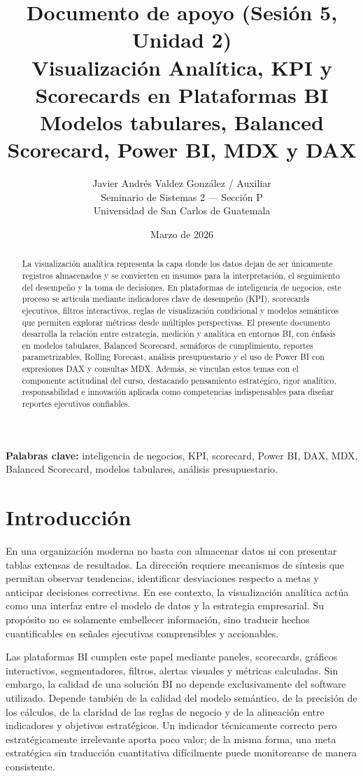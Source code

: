 \documentclass[12pt]{article}
\title{\textbf{Documento de apoyo (Sesión 5, Unidad 2)}\\
\large Visualización Analítica, KPI y Scorecards en Plataformas BI\\
\normalsize Modelos tabulares, Balanced Scorecard, Power BI, MDX y DAX}
\author{Javier Andrés Valdez González / Auxiliar \\
\small Seminario de Sistemas 2 --- Sección P \\
\small Universidad de San Carlos de Guatemala}
\date{Marzo de 2026}
\begin{document}
\maketitle

\begin{abstract}
La visualización analítica representa la capa donde los datos dejan de ser únicamente registros almacenados y se convierten en insumos para la interpretación, el seguimiento del desempeño y la toma de decisiones. En plataformas de inteligencia de negocios, este proceso se articula mediante indicadores clave de desempeño (KPI), scorecards ejecutivos, filtros interactivos, reglas de visualización condicional y modelos semánticos que permiten explorar métricas desde múltiples perspectivas. El presente documento desarrolla la relación entre estrategia, medición y analítica en entornos BI, con énfasis en modelos tabulares, Balanced Scorecard, semáforos de cumplimiento, reportes parametrizables, Rolling Forecast, análisis presupuestario y el uso de Power BI con expresiones DAX y consultas MDX. Además, se vinculan estos temas con el componente actitudinal del curso, destacando pensamiento estratégico, rigor analítico, responsabilidad e innovación aplicada como competencias indispensables para diseñar reportes ejecutivos confiables.
\end{abstract}

\textbf{Palabras clave:} inteligencia de negocios, KPI, scorecard, Power BI, DAX, MDX, Balanced Scorecard, modelos tabulares, análisis presupuestario.

\newpage
\tableofcontents

\section{Introducción}
En una organización moderna no basta con almacenar datos ni con presentar tablas extensas de resultados. La dirección requiere mecanismos de síntesis que permitan observar tendencias, identificar desviaciones respecto a metas y anticipar decisiones correctivas. En ese contexto, la visualización analítica actúa como una interfaz entre el modelo de datos y la estrategia empresarial. Su propósito no es solamente embellecer información, sino traducir hechos cuantificables en señales ejecutivas comprensibles y accionables.

Las plataformas BI cumplen este papel mediante paneles, scorecards, gráficos interactivos, segmentadores, filtros, alertas visuales y métricas calculadas. Sin embargo, la calidad de una solución BI no depende exclusivamente del software utilizado. Depende también de la calidad del modelo semántico, de la precisión de los cálculos, de la claridad de las reglas de negocio y de la alineación entre indicadores y objetivos estratégicos. Un indicador técnicamente correcto pero estratégicamente irrelevante aporta poco valor; de la misma forma, una meta estratégica sin traducción cuantitativa difícilmente puede monitorearse de manera consistente.
\end{document}
